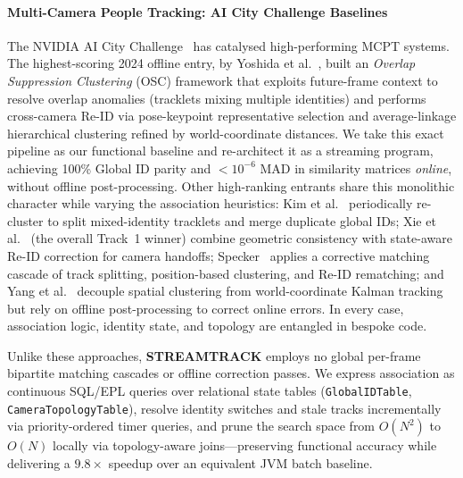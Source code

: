 \documentclass[5p,times]{elsarticle}
\begin{document}
\paragraph{Multi-Camera People Tracking: AI City Challenge Baselines}
The NVIDIA AI City Challenge~\cite{wang2024aicity} has catalysed high-performing MCPT systems. The highest-scoring 2024 offline entry, by Yoshida et al.~\cite{yoshida2024overlap}, built an \emph{Overlap Suppression Clustering} (OSC) framework that exploits future-frame context to resolve overlap anomalies (tracklets mixing multiple identities) and performs cross-camera Re-ID via pose-keypoint representative selection and average-linkage hierarchical clustering refined by world-coordinate distances. We take this exact pipeline as our functional baseline and re-architect it as a streaming program, achieving 100\% Global ID parity and $<10^{-6}$ MAD in similarity matrices \emph{online}, without offline post-processing. Other high-ranking entrants share this monolithic character while varying the association heuristics: Kim et al.~\cite{kim2024cluster} periodically re-cluster to split mixed-identity tracklets and merge duplicate global IDs; Xie et al.~\cite{xie2024robust} (the overall Track~1 winner) combine geometric consistency with state-aware Re-ID correction for camera handoffs; Specker~\cite{specker2024ocmctrack} applies a corrective matching cascade of track splitting, position-based clustering, and Re-ID rematching; and Yang et al.~\cite{yang2024online} decouple spatial clustering from world-coordinate Kalman tracking but rely on offline post-processing to correct online errors. In every case, association logic, identity state, and topology are entangled in bespoke code.

Unlike these approaches, \textbf{STREAMTRACK} employs no global per-frame bipartite matching cascades or offline correction passes. We express association as continuous SQL/EPL queries over relational state tables (\texttt{GlobalIDTable},\\ \texttt{CameraTopologyTable}), resolve identity switches and stale tracks incrementally via priority-ordered timer queries, and prune the search space from $O(N^2)$ to $O(N)$ locally via topology-aware joins---preserving functional accuracy while delivering a $9.8\times$ speedup over an equivalent JVM batch baseline.
\end{document}
